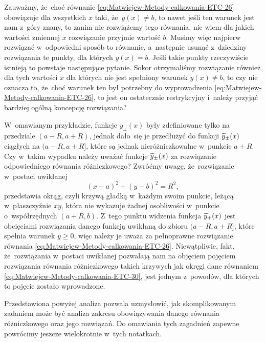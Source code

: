 \documentclass[a4paper,11pt]{article}
\numberwithin{equation}{section}
\begin{document}
Zauważmy, że~choć równanie \eqref{eq:Matwiejew-Metody-calkowania-ETC-26}
obowiązuje dla wszystkich $x$ taki, że~$y( x ) \neq b$, to nawet jeśli ten
warunek jest nam z~góry znany, to zanim nie rozwiążemy tego równania, nie
wiem dla jakich wartości zmiennej $x$ rozwiązanie przyjmie wartość $b$.
Musimy więc najpierw rozwiązać w~odpowiedni sposób to równanie, a~następnie
usunąć z~dziedziny rozwiązania te punkty, dla których $y( x ) = b$. Jeśli
takie punkty rzeczywiście istnieją to powstaje następujące pytanie. Sokor
otrzymaliśmy rozwiązanie również dla tych wartości $x$ dla
których nie jest spełniony warunek $y( x ) \neq b$, to czy nie oznacza to,
że~choć warunek ten był potrzebny do wyprowadzenia
\eqref{eq:Matwiejew-Metody-calkowania-ETC-26}, to jest on ostatecznie
restrykcyjny i~należy przyjąć bardziej ogólną koncepcję rozwiązania?

W~omawianym przykładzie, funkcje $y_{ \pm }( x )$ były zdefiniowane tylko na
przedziale $( a - R, a + R )$, jednak dało~się je przedłużyć do funkcji
$\widetilde{y}_{ \pm }( x )$ ciągłych na $( a - R, a + R ]$, które są jednak
nieróżniczkowalne w~punkcie $a + R$. Czy w~takim wypadku należy uważać
funkcje $\widetilde{y}_{ \pm }( x )$ za rozwiązanie odpowiedniego równania
różniczkowego? Zwróćmy uwagę, że~rozwiązanie w~postaci uwikłanej
\begin{equation}
  \label{eq:Matwiejew-Metody-calkowania-ETC-30}
  ( x - a )^{ 2 } + ( y - b )^{ 2 } = R^{ 2 },
\end{equation}
przedstawia okrąg, czyli krzywą gładką w~każdym swoim punkcie, leżącą
w~płaszczyźnie $xy$, która nie wykazuje żadnej osobliwości w~punkcie
o~współrzędnych $( a + R, b )$. Z~tego
punktu widzenia funkcja $\widetilde{y}_{ + }( x )$ jest obcięciami rozwiązania
danego funkcją uwikłaną do zbioru $( a - R, a + R ]$, które spełnia warunek
$y \geq 0$, więc należy je uważa za pełnoprawne rozwiązanie równania
\eqref{eq:Matwiejew-Metody-calkowania-ETC-26}. Niewątpliwie, fakt,
że~rozwiązania w~postaci uwikłanej pozwalają nam na objęciem pojęciem
rozwiązania równania różniczkowego takich krzywych jak okręgi dane równaniem
\eqref{eq:Matwiejew-Metody-calkowania-ETC-30}, jest jednym z~powodów, dla
których to pojęcie zostało wprowadzone.

Przedstawiona powyżej analiza pozwala uzmysłowić, jak skomplikowanym
zadaniem może być analiza zakresu obowiązywania danego równania
różniczkowego oraz jego rozwiązań. Do omawiania tych zagadnień zapewne
powrócimy jeszcze wielokrotnie w~tych notatkach.

\VerSpaceFour
\end{document}
